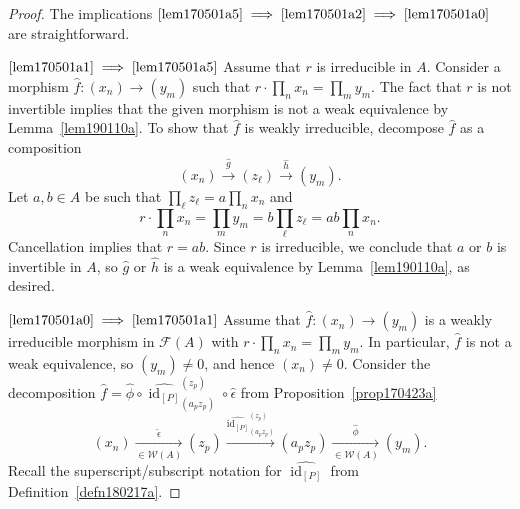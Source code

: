\documentclass[reqno]{amsart}
\theoremstyle{plain}
\theoremstyle{definition}
\newcommand{\cat}[1]{\mathcal{#1}}
\newcommand{\catw}{\cat{W}}
\newcommand{\catf}{\cat{F}}
\newcommand{\id}{\operatorname{id}}
\newcommand{\xra}{\xrightarrow}
\newcommand{\emptytuple}{\mathfrak{0}}
\numberwithin{equation}{lem}
\begin{document}
\begin{proof}
The implications $\eqref{lem170501a5}\implies\eqref{lem170501a2}
\implies\eqref{lem170501a0}$
are straightforward.

$\eqref{lem170501a1}\implies\eqref{lem170501a5}$
Assume that $r$ is irreducible in $A$.
Consider a morphism 
$\hat f\colon (x_n)\to (y_m)$ such that $r\cdot\prod_nx_n=\prod_my_m$.
The fact that $r$ is not invertible implies that the given morphism is not a weak equivalence by Lemma~\ref{lem190110a}.
To show that $\hat f$ is weakly irreducible, decompose $\hat f$ as a composition
$$(x_n)\xra{\hat g}(z_\ell)\xra{\hat h}(y_m).$$
Let $a,b\in A$ be such that $\prod_\ell z_\ell=a\prod_nx_n$ and 
$$\textstyle r\cdot\prod_nx_n=\prod_my_m=b\prod_\ell z_\ell=ab\prod_nx_n.$$
Cancellation implies that $r=ab$.
Since $r$ is irreducible, we conclude that $a$ or $b$ is invertible in $A$,
so $\hat g$ or $\hat h$ is a weak equivalence by Lemma~\ref{lem190110a}, as desired.

$\eqref{lem170501a0}\implies\eqref{lem170501a1}$
Assume that $\hat f\colon (x_n)\to (y_m)$ is a weakly irreducible morphism in $\catf(A)$ with $r\cdot\prod_nx_n=\prod_my_m$.
In particular, $\hat f$ is not a weak equivalence, so $(y_m)\neq\emptytuple$, and hence $(x_n)\neq\emptytuple$.
Consider the decomposition $\hat f=\hat\phi\circ\widehat{\id_{[P]}}^{(z_p)}_{(a_pz_p)}
\circ\hat\epsilon$ from Proposition~\ref{prop170423a}
\begin{equation}\label{eq190114a}
(x_n)\xra[\in\catw(A)]{\hat\epsilon}(z_p)\xra{\widehat{\id_{[P]}}^{(z_p)}_{(a_pz_p)}}
(a_pz_p)
\xra[\in\catw(A)]{\hat\phi}(y_m).
\end{equation}
Recall the superscript/subscript notation for $\widehat{\id_{[P]}}$ from Definition~\ref{defn180217a}.


\end{proof}
\end{document}
